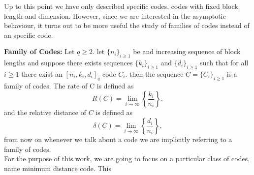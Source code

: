 Up to this point we have only described specific codes, codes with fixed block length and dimension. However, since we are interested in the asymptotic behaviour, it turns out to be more useful the study of families of codes instead of an specific code.

\begin{definition}
\textbf{Family of Codes:} Let $q\geq 2$. let $\{n_i\}_{i\geq 1}$ be and increasing sequence of block lengths and suppose there exists sequences $\{k_i\}_{i\geq 1}$ and $\{d_i\}_{i\geq 1}$ such that for all $i\geq 1$ there exist an $[n_i,k_i,d_i]_q$ code $C_i$. then the sequence $C=\{C_i\}_{i\geq1}$ is a family of codes. The rate of C is defined as
\begin{equation}
R(C)=\lim _{i \rightarrow \infty}\left\{\frac{k_{i}}{n_{i}}\right\},
\label{CH2:Rate_of_family_code}
\end{equation}
and the relative distance of $C$ is defined as
\begin{equation}
\delta(C)=\lim _{i \rightarrow \infty}\left\{\frac{d_{i}}{n_{i}}\right\},
\label{CH2:Relative_distance_of_family_code}
\end{equation}
from now on whenever we talk about a code we are implicitly referring to a family of codes.\\
For the purpose of this work, we are going to focus on a particular class of codes, name minimum distance code. This 

\end{definition}







